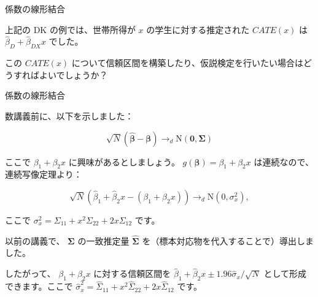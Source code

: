 \documentclass[11pt,handout]{beamer}
\newenvironment{wideitemize}{\itemize\addtolength{\itemsep}{10pt}}{\enditemize}
\begin{document}
\begin{frame}{係数の線形結合}
	\begin{wideitemize}
		\item
		上記の DK の例では、世帯所得が $x$ の学生に対する推定された $CATE(x)$ は $\hat\beta_D+ \hat\beta_{DX} x$ でした。
		
		\pause
		\item
		この $CATE(x)$ について信頼区間を構築したり、仮説検定を行いたい場合はどうすればよいでしょうか？
		
	\end{wideitemize}
\end{frame}


\begin{frame}{係数の線形結合}
	\begin{wideitemize}
		\item
		数講義前に、以下を示しました：
		
		$$\sqrt{N} (\bm{\hat\beta} - \bm\beta ) \rightarrow_d \mathrm{N}(\bm{0}, \bm{\Sigma}) $$
		
		\pause
		\item
		ここで $\beta_1 + \beta_2 x$ に興味があるとしましょう。 \pause{} $g(\bm{\beta}) = \beta_1 + \beta_2x$ は連続なので、連続写像定理より： \pause{}
		
		$$\sqrt{N}( \hat\beta_1 + \hat\beta_{2} x- ( \beta_1 + \beta_{2} x)) \rightarrow_d \mathrm{N}(0, \sigma_x^2) ,$$
		
		\noindent ここで $\sigma_x^2 = \Sigma_{11} + x^2 \Sigma_{22} + 2 x \Sigma_{12}$ です。
		
		
		\pause
		\item
		以前の講義で、 $\bm{\Sigma}$ の一致推定量 $\hat{\bm{\Sigma}}$ を（標本対応物を代入することで）導出しました。
				
		\pause
		\item
		したがって、 $\beta_1 + \beta_2 x$ に対する信頼区間を $\hat\beta_1 + \hat\beta_2 x \pm 1.96 \hat\sigma_x / \sqrt{N}$ として形成できます。ここで $\hat\sigma_x^2 = \hat\Sigma_{11} + x^2 \hat\Sigma_{22} + 2 x   \hat\Sigma_{12}$ です。
	\end{wideitemize}
\end{frame}
\end{document}
